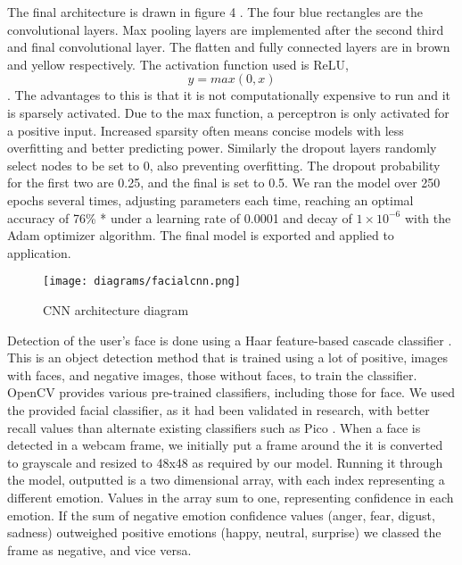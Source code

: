 \documentclass[12pt,a4paper]{article}
\begin{document}
The final architecture is drawn in figure 4 \cite{bauerle2021net2vis}. The four blue rectangles are the convolutional layers. Max pooling layers are implemented after the second third and final convolutional layer. The flatten and fully connected layers are in brown and yellow respectively. The activation function used is ReLU, \[ y = max(0,x) \]. The advantages to this is that it is not computationally expensive to run and it is sparsely activated. Due to the max function, a perceptron is only activated for a positive input. Increased sparsity often means concise models with less overfitting and better predicting power. Similarly the dropout layers randomly select nodes to be set to 0, also preventing overfitting. The dropout probability for the first two are 0.25, and the final is set to 0.5. We ran the model over 250 epochs several times, adjusting parameters each time, reaching an optimal accuracy of 76\% * under a learning rate of 0.0001 and decay of $1 \times 10^{-6}$ with the Adam optimizer algorithm. The final model is exported and applied to application.

\begin{figure}[h]
	\centerline{\texttt{[image: diagrams/facialcnn.png]}}
	\caption{CNN architecture diagram}
\end{figure}


Detection of the user's face is done using a Haar feature-based cascade classifier \cite{viola2001rapid}. This is an object detection method that is trained using a lot of positive, images with faces, and negative images, those without faces, to train the classifier. OpenCV provides various pre-trained classifiers, including those for face. We used the provided facial classifier, as it had been validated in research, with better recall values than alternate existing classifiers such as Pico \cite{kalinovskii2015compact}. When a face is detected in a webcam frame, we initially put a frame around the it is converted to grayscale and resized to 48x48 as required by our model. Running it through the model, outputted is a two dimensional array, with each index representing a different emotion. Values in the array sum to one, representing confidence in each emotion. If the sum of negative emotion confidence values (anger, fear, digust, sadness) outweighed positive emotions (happy, neutral, surprise) we classed the frame as negative, and vice versa. 
\end{document}
